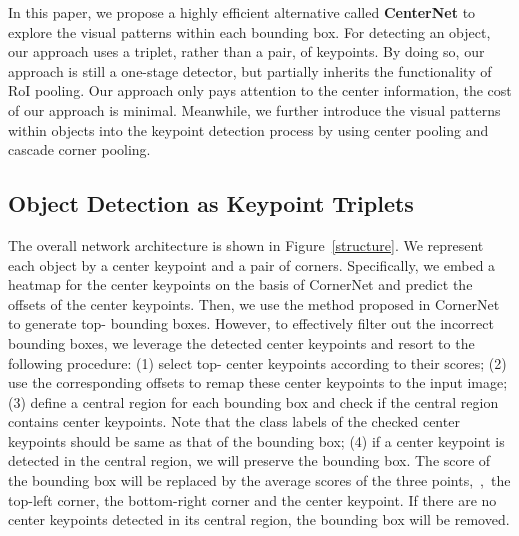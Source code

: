 \documentclass[10pt,twocolumn,letterpaper]{article}
\begin{document}
In this paper, we propose a highly efficient alternative called \textbf{CenterNet} to explore the visual patterns within each bounding box.
For detecting an object, our approach uses a triplet, rather than a pair, of keypoints. By doing so, our approach is still a one-stage detector, but partially inherits the functionality of RoI pooling. Our approach only pays attention to the center information, the cost of our approach is minimal. Meanwhile, we further introduce the visual patterns within objects into the keypoint detection process by using center pooling and cascade corner pooling.

\subsection{Object Detection as Keypoint Triplets}\label{Triplets}
The overall network architecture is shown in Figure~\ref{structure}. We represent each object by a center keypoint and a pair of corners. Specifically, we embed a heatmap for the center keypoints on the basis of CornerNet and predict the offsets of the center keypoints. Then, we use the method proposed in CornerNet~\cite{law2018cornernet} to generate top- bounding boxes. However, to effectively filter out the incorrect bounding boxes, we leverage the detected center keypoints and resort to the following procedure: (1) select top- center keypoints according to their scores; (2) use the corresponding offsets to remap these center keypoints to the input image; (3) define a central region for each bounding box and check if the central region contains center keypoints. Note that the class labels of the checked center keypoints should be same as that of the bounding box; (4) if a center keypoint is detected in the central region, we will preserve the bounding box. The score of the bounding box will be replaced by the average scores of the three points,~\ie,~the top-left corner, the bottom-right corner and the center keypoint. If there are no center keypoints detected in its central region, the bounding box will be removed.
\end{document}

